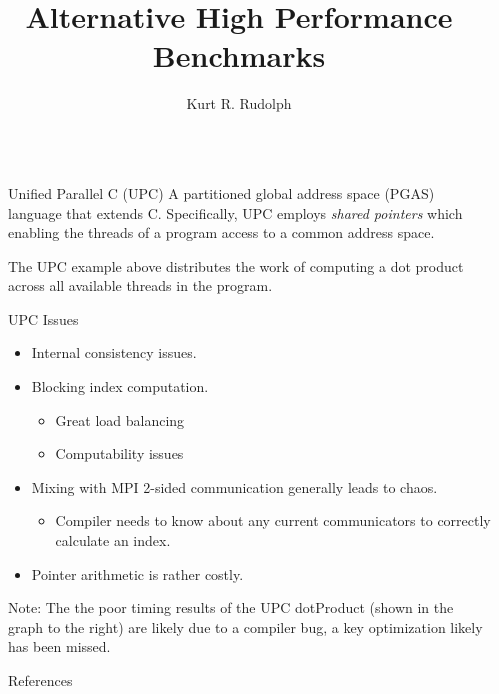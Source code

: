 \documentclass[final]{beamer}
\title{Alternative High Performance Benchmarks}
\author{Kurt R. Rudolph}
\institute{Department of Computer Science, University of Illinois Urbana-Champaign}
\newlength{\sepwid}
\newlength{\onecolwid}
\begin{document}
\begin{frame}[t]
	\begin{columns}[t]												%
		\begin{column}{\sepwid}\end{column}			%
			\begin{column}{\onecolwid}
				\begin{block}{Unified Parallel C (UPC)}
					A partitioned global address space (PGAS) language that extends C. Specifically, UPC employs \emph{shared pointers} which enabling the threads of a program access to a common address space.
					
					The UPC example above distributes the work of computing a dot product across all available threads in the program. 
				\end{block}
				\vspace{2 mm}
				\begin{alertblock}{UPC Issues}
					\begin{itemize}
						\item Internal consistency issues.
						\item Blocking index computation.
							\begin{itemize}
							\item Great load balancing 
							\item Computability issues
							\end{itemize}
						\item Mixing with MPI 2-sided communication generally leads to chaos.
							\begin{itemize}
								\item Compiler needs to know about any current communicators to correctly calculate an index.
							\end{itemize}
						\item Pointer arithmetic is rather costly.
					\end{itemize}
				\end{alertblock}
				Note: The the poor timing results of the UPC dotProduct  (shown in the graph to the right)  are likely due to a compiler bug, a key optimization likely has been missed.  
				\begin{block}{References}
					\tiny{}
\end{block}
\end{column}
\end{columns}
\end{frame}
\end{document}
